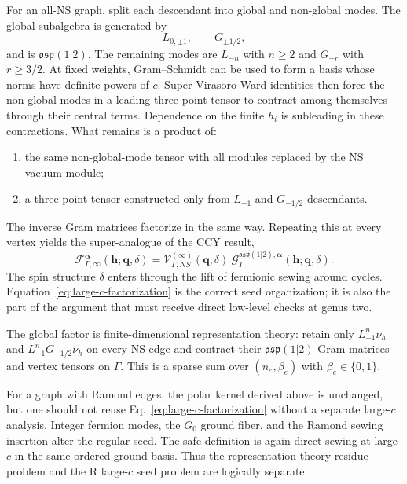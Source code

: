 \documentclass[11pt]{article}
\newcommand{\osp}{\mathfrak{osp}(1|2)}
\newcommand{\F}{\mathcal F}
\newcommand{\G}{\mathcal G}
\newcommand{\V}{\mathcal V}
\begin{document}
For an all-NS graph, split each descendant into global and non-global modes.
The global
subalgebra is generated by
\begin{equation}
 L_{0,\pm1},\qquad G_{\pm1/2},
 \label{eq:global-algebra}
\end{equation}
and is $\osp$.  The remaining modes are $L_{-n}$ with $n\ge2$ and $G_{-r}$
with $r\ge3/2$.  At fixed weights, Gram--Schmidt can be used to form a basis
whose norms have definite powers of $c$.  Super-Virasoro Ward identities then
force the non-global modes in a leading three-point tensor to contract among
themselves through their central terms.  Dependence on the finite $h_i$ is
subleading in these contractions.  What remains is a product of:
\begin{enumerate}
 \item the same non-global-mode tensor with all modules replaced by the NS
 vacuum module;
 \item a three-point tensor constructed only from $L_{-1}$ and $G_{-1/2}$
 descendants.
\end{enumerate}
The inverse Gram matrices factorize in the same way.  Repeating this at every
vertex yields the super-analogue of the CCY result,
\begin{equation}
 \boxed{
 \F_{\Gamma,\infty}^{\boldsymbol\alpha}
 (\boldsymbol h;\boldsymbol q,\delta)
 =\V_{\Gamma,NS}^{(\infty)}(\boldsymbol q;\delta)
 \ \G_{\Gamma}^{\osp,\boldsymbol\alpha}
 (\boldsymbol h;\boldsymbol q,\delta).}
 \label{eq:large-c-factorization}
\end{equation}
The spin structure $\delta$ enters through the lift of fermionic sewing
around cycles.  Equation~\eqref{eq:large-c-factorization} is the correct seed
organization; it is also the part of the argument that must receive direct
low-level checks at genus two.

The global factor is finite-dimensional representation theory: retain only
$L_{-1}^{n}\nu_h$ and $L_{-1}^{n}G_{-1/2}\nu_h$ on every NS edge and contract
their $\osp$ Gram matrices and vertex tensors on $\Gamma$.  This is a sparse
sum over $(n_e,\beta_e)$ with $\beta_e\in\{0,1\}$.

For a graph with Ramond edges, the polar kernel derived above is unchanged,
but one should not reuse Eq.~\eqref{eq:large-c-factorization} without a
separate large-$c$ analysis.  Integer fermion modes, the $G_0$ ground fiber,
and the Ramond sewing insertion alter the regular seed.  The safe definition
is again direct sewing at large $c$ in the same ordered ground basis.  Thus
the representation-theory residue problem and the R large-$c$ seed problem
are logically separate.
\end{document}

